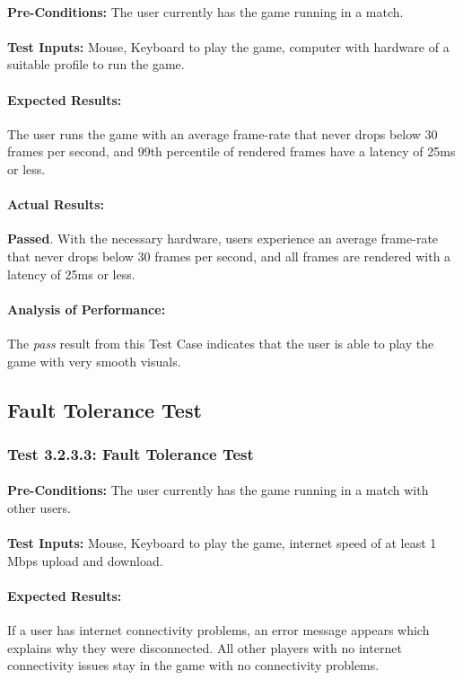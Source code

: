 \documentclass{article}
\begin{document}
    \paragraph{}\textbf{Pre-Conditions:} The user currently has the game running in a match.
    \paragraph{}\textbf{Test Inputs:} Mouse, Keyboard to play the game, computer with hardware of a suitable profile to run the game.
    \paragraph{Expected Results:} The user runs the game with an average frame-rate that never drops below 30 frames per second, and 99th percentile of rendered frames have a latency of 25ms or less.
    \paragraph{Actual Results:} \textbf{Passed}. With the necessary hardware, users experience an average frame-rate that never drops below 30 frames per second, and all frames are rendered with a latency of 25ms or less. 
    \paragraph{Analysis of Performance:} The \emph{pass} result from this Test Case indicates that the user is able to play the game with very smooth visuals.
\subsection{Fault Tolerance Test}
\subsubsection{Test 3.2.3.3: Fault Tolerance Test }
    \paragraph{}\textbf{Pre-Conditions:} The user currently has the game running in a match with other users.
    \paragraph{}\textbf{Test Inputs:} Mouse, Keyboard to play the game, internet speed of at least 1 Mbps upload and download.
    \paragraph{Expected Results:} If a user has internet connectivity problems, an error message appears which explains why they were disconnected. All other players with no internet connectivity issues stay in the game with no connectivity problems. 
\end{document}
